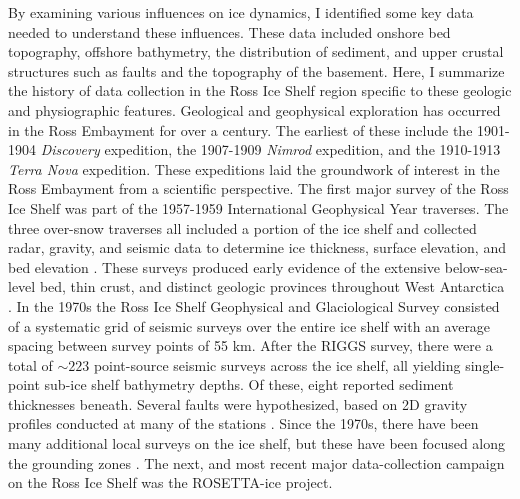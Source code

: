 By examining various influences on ice dynamics, I identified some key data needed to understand these influences. These data included onshore bed topography, offshore bathymetry, the distribution of sediment, and upper crustal structures such as faults and the topography of the basement. Here, I summarize the history of data collection in the Ross Ice Shelf region specific to these geologic and physiographic features. Geological and geophysical exploration has occurred in the Ross Embayment for over a century. The earliest of these include the 1901-1904 \textit{Discovery} expedition, the 1907-1909 \textit{Nimrod} expedition, and the 1910-1913 \textit{Terra Nova} expedition. These expeditions laid the groundwork of interest in the Ross Embayment from a scientific perspective. The first major survey of the Ross Ice Shelf was part of the 1957-1959 International Geophysical Year traverses. The three over-snow traverses all included a portion of the ice shelf and collected radar, gravity, and seismic data to determine ice thickness, surface elevation, and bed elevation \citep{craryoversnow1959}. These surveys produced early evidence of the extensive below-sea-level bed, thin crust, and distinct geologic provinces throughout West Antarctica \citep{bentleystructure1960}. In the 1970s the Ross Ice Shelf Geophysical and Glaciological Survey \citep[RIGGS,][]{bentleyross1984} consisted of a systematic grid of seismic surveys over the entire ice shelf with an average spacing between survey points of 55 km. After the RIGGS survey, there were a total of $\sim223$ point-source seismic surveys across the ice shelf, all yielding single-point sub-ice shelf bathymetry depths. Of these, eight reported sediment thicknesses beneath. Several faults were hypothesized, based on 2D gravity profiles conducted at many of the stations \citep{greischaranalysis1992}. Since the 1970s, there have been many additional local surveys on the ice shelf, but these have been focused along the grounding zones \citep[e.g.,][]{horganpoststagnation2017, mutobathymetry2013, pattersonsensitivity2022, sternseismic1994, tenbrinkgeophysical1993, wannamakeruplift2017}. The next, and most recent major data-collection campaign on the Ross Ice Shelf was the ROSETTA-ice project. \\


